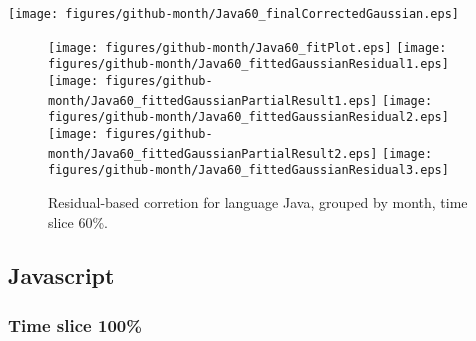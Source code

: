 \begin{center}
{\texttt{[image: figures/github-month/Java60\_finalCorrectedGaussian.eps]}}
\end{center}

\FloatBarrier

\begin{figure}[t]
\centering
{}
{\texttt{[image: figures/github-month/Java60\_fitPlot.eps]}}
{\texttt{[image: figures/github-month/Java60\_fittedGaussianResidual1.eps]}}
{\texttt{[image: figures/github-month/Java60\_fittedGaussianPartialResult1.eps]}}
{\texttt{[image: figures/github-month/Java60\_fittedGaussianResidual2.eps]}}
{\texttt{[image: figures/github-month/Java60\_fittedGaussianPartialResult2.eps]}}
{\texttt{[image: figures/github-month/Java60\_fittedGaussianResidual3.eps]}}
\caption{Residual-based corretion for language Java, grouped by month, time slice 60\%.}
\end{figure}


\FloatBarrier


\subsection{Javascript}

\subsubsection{Time slice 100\%}


